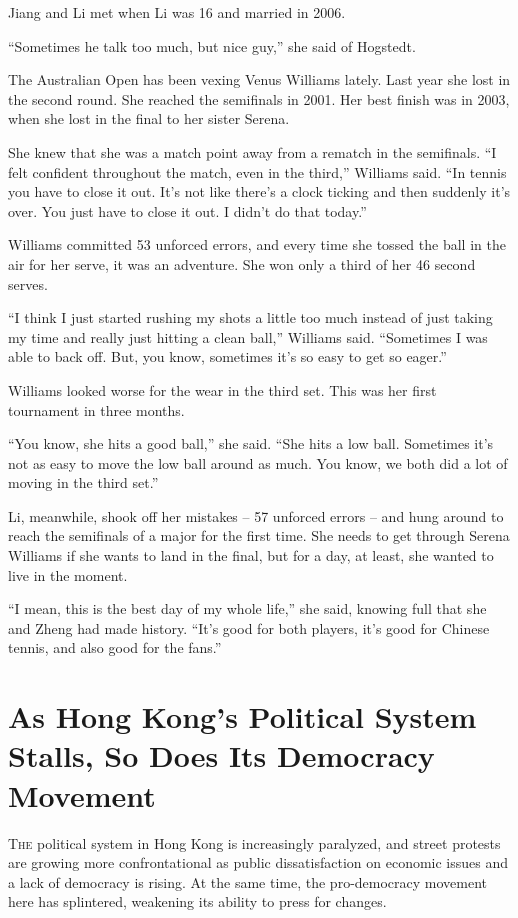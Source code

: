 ﻿\documentclass[12pt]{article}
\begin{document}
Jiang and Li met when Li was 16 and married in 2006.

``Sometimes he talk too much, but nice guy,'' she said of Hogstedt.

The Australian Open has been vexing Venus Williams lately. Last year she lost in the second round.
She reached the semifinals in 2001. Her best finish was in 2003, when she lost in the final to her
sister Serena.

She knew that she was a match point away from a rematch in the semifinals. ``I felt confident
throughout the match, even in the third,'' Williams said. ``In tennis you have to close it out. It's
not like there's a clock ticking and then suddenly it's over. You just have to close it out. I
didn't do that today.''

Williams committed 53 unforced errors, and every time she tossed the ball in the air for her serve,
it was an adventure. She won only a third of her 46 second serves.

``I think I just started rushing my shots a little too much instead of just taking my time and
really just hitting a clean ball,'' Williams said. ``Sometimes I was able to back off. But, you
know, sometimes it's so easy to get so eager.''

Williams looked worse for the wear in the third set. This was her first tournament in three months.

``You know, she hits a good ball,'' she said. ``She hits a low ball. Sometimes it's not as easy to
move the low ball around as much. You know, we both did a lot of moving in the third set.''

Li, meanwhile, shook off her mistakes -- 57 unforced errors -- and hung around to reach the
semifinals of a major for the first time. She needs to get through Serena Williams if she wants to
land in the final, but for a day, at least, she wanted to live in the moment.

``I mean, this is the best day of my whole life,'' she said, knowing full that she and Zheng had
made history. ``It's good for both players, it's good for Chinese tennis, and also good for the
fans.''

\section{As Hong Kong's Political System Stalls, So Does Its Democracy Movement}

\lettrine{T}{he} political system in Hong Kong is increasingly paralyzed,
and street protests are growing more confrontational as public dissatisfaction on economic issues
and a lack of democracy is rising. At the same time, the pro-democracy movement here has splintered,
weakening its ability to press for changes.
\end{document}
